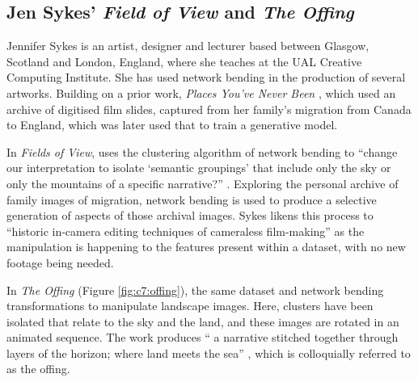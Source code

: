 \subsection{Jen Sykes' \textit{Field of View} and \textit{The Offing}}

Jennifer Sykes is an artist, designer and lecturer based between Glasgow, Scotland and London, England, where she teaches at the UAL Creative Computing Institute.
She has used network bending in the production of several artworks. Building on a prior work, \textit{Places You’ve Never Been} \citep{sykes2018places}, which used an archive of digitised film slides, captured from her family's migration from Canada to England, which was later used that to train a generative model. 

In \textit{Fields of View}, uses the clustering algorithm of network bending to “change our interpretation to isolate ‘semantic groupings’ that include only the sky or only the mountains of a specific narrative?” \citep{sykes2021fields}. 
Exploring the personal archive of family images of migration, network bending is used to produce a selective generation of aspects of those archival images. 
Sykes likens this process to “historic in-camera editing techniques of cameraless film-making” \citep{sykes2021fields} as the manipulation is happening to the features present within a dataset, with no new footage being needed.

In \textit{The Offing} (Figure \ref{fig:c7:offing}), the same dataset and network bending transformations to manipulate landscape images. 
Here, clusters have been isolated that relate to the sky and the land, and these images are rotated in an animated sequence. 
The work produces “ a narrative stitched together through layers of the horizon; where land meets the sea”  \cite{sykes2022offing}, which is colloquially referred to as the offing. 

